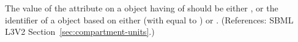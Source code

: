 The value of the attribute  on a \Compartment object having
 of  should be either 
, or the identifier of a \UnitDefinition object based on
either  (with  equal to ) or
.  (References: SBML L3V2
Section~\ref{sec:compartment-units}.)
